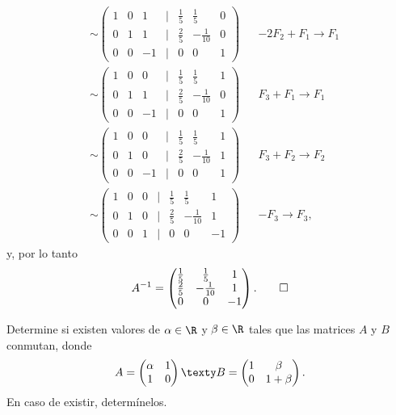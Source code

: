 \documentclass[11pt,respuestas,a4]{aleph-examen}
\begin{document}
\begin{preguntas}
\begin{respuesta}
\begin{align*}
        & \sim \begin{pmatrix}
            1 & 0 & 1 & | & \frac{1}{5} & \frac{1}{5} & 0 \\
            0 & 1 & 1 & | & \frac{2}{5} & -\frac{1}{10} & 0 \\
            0 & 0 & -1 & | & 0 & 0 & 1
        \end{pmatrix} && - 2F_2 + F_1 \rightarrow F_1 \\
        & \sim \begin{pmatrix}
            1 & 0 & 0 & | & \frac{1}{5} & \frac{1}{5} & 1 \\
            0 & 1 & 1 & | & \frac{2}{5} & -\frac{1}{10} & 0 \\
            0 & 0 & -1 & | & 0 & 0 & 1
        \end{pmatrix} &&  F_3 + F_1 \rightarrow F_1 \\
        & \sim \begin{pmatrix}
            1 & 0 & 0 & | & \frac{1}{5} & \frac{1}{5} & 1 \\
            0 & 1 & 0 & | & \frac{2}{5} & -\frac{1}{10} & 1 \\
            0 & 0 & -1 & | & 0 & 0 & 1
        \end{pmatrix} && F_3 + F_2 \rightarrow F_2 \\
        & \sim \begin{pmatrix}
            1 & 0 & 0 & | & \frac{1}{5} & \frac{1}{5} & 1 \\
            0 & 1 & 0 & | & \frac{2}{5} & -\frac{1}{10} & 1 \\
            0 & 0 & 1 & | & 0 & 0 & -1
        \end{pmatrix} && - F_3 \rightarrow F_3,
    \end{align*}
    y, por lo tanto
    \[
        A^{-1} = \begin{pmatrix}
            \frac{1}{5} & \frac{1}{5} & 1 \\
            \frac{2}{5} & -\frac{1}{10} & 1 \\
            0 & 0 & -1
        \end{pmatrix}.    \qedhere
    \]

\end{respuesta}
\item
    Determine si existen valores de $\alpha\in\R$ y $\beta\in\R$ tales que las matrices $A$ y $B$ conmutan, donde
    \[
    A = \begin{pmatrix}
        \alpha & 1 \\
        1 & 0
    \end{pmatrix} \texty B = \begin{pmatrix}
        1 & \beta \\
        0 & 1+\beta
    \end{pmatrix}.
    \]
    En caso de existir, determínelos.


\end{preguntas}
\end{document}
